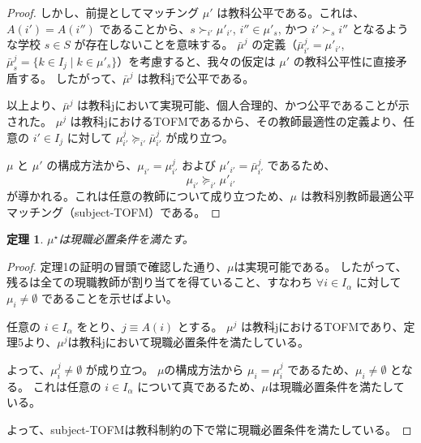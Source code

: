 \documentclass[12pt, a4paper]{article}
\theoremstyle{definition}
\theoremstyle{remark}
\theoremstyle{plain}
\newtheorem{theorem}{定理}
\begin{document}
\begin{proof}
しかし、前提としてマッチング $\mu'$ は教科公平である。これは、$A(i')=A(i'')$ であることから、$s \succ_{i'} \mu'_{i'}$, $i'' \in \mu'_s$, かつ $i' \succ_s i''$ となるような学校 $s \in S$ が存在しないことを意味する。
$\bar{\mu}^j$ の定義（$\bar{\mu}^j_{i'} = \mu'_{i'}$, $\bar{\mu}^j_s = \{k \in I_j \mid k \in \mu'_s\}$）を考慮すると、我々の仮定は $\mu'$ の教科公平性に直接矛盾する。
したがって、$\bar{\mu}^j$ は教科jで公平である。

\vspace{\baselineskip}

以上より、$\bar{\mu}^j$ は教科jにおいて実現可能、個人合理的、かつ公平であることが示された。
$\mu^j$ は教科jにおけるTOFMであるから、その教師最適性の定義より、任意の $i' \in I_j$ に対して $\mu^j_{i'} \succeq_{i'} \bar{\mu}^j_{i'}$ が成り立つ。

$\mu$ と $\mu'$ の構成方法から、$\mu_{i'} = \mu^j_{i'}$ および $\mu'_{i'} = \bar{\mu}^j_{i'}$ であるため、
\[
 \mu_{i'} \succeq_{i'} \mu'_{i'}
\]
が導かれる。これは任意の教師について成り立つため、$\mu$ は教科別教師最適公平マッチング（subject-TOFM）である。




\end{proof}



\begin{theorem}
    $\mu^\star$は現職必置条件を満たす。
\end{theorem}
\begin{proof}
定理1の証明の冒頭で確認した通り、$\mu$は実現可能である。
したがって、残るは全ての現職教師が割り当てを得ていること、すなわち $\forall i \in I_\alpha$ に対して $\mu_i \neq \emptyset$ であることを示せばよい。

任意の $i \in I_\alpha$ をとり、$j \equiv A(i)$ とする。
$\mu^j$ は教科jにおけるTOFMであり、定理5より、$\mu^j$は教科jにおいて現職必置条件を満たしている。

よって、$\mu^j_i \neq \emptyset$ が成り立つ。
$\mu$の構成方法から $\mu_i = \mu^j_i$ であるため、$\mu_i \neq \emptyset$ となる。
これは任意の $i \in I_\alpha$ について真であるため、$\mu$は現職必置条件を満たしている。

よって、subject-TOFMは教科制約の下で常に現職必置条件を満たしている。
\end{proof}
\end{document}
